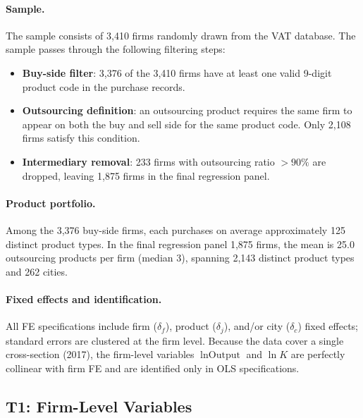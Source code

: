 \documentclass[12pt]{article}
\begin{document}
\paragraph{Sample.}
The sample consists of 3,410 firms randomly drawn from the VAT database.
The sample passes through the following filtering steps:
\begin{itemize}[leftmargin=1.5em,nosep]
  \item \textbf{Buy-side filter}: 3,376 of the 3,410 firms have at least one
    valid 9-digit product code in the purchase records.
  \item \textbf{Outsourcing definition}: an outsourcing product requires the
    same firm to appear on both the buy and sell side for the
    same product code. Only 2,108 firms satisfy this condition. 
  \item \textbf{Intermediary removal}: 233 firms with outsourcing ratio
    \(>90\%\) are dropped, leaving
    1,875 firms in the final regression panel.
\end{itemize}


\paragraph{Product portfolio.}
Among the 3,376 buy-side firms, each purchases on average approximately 125
distinct product types.
In the final regression panel 1,875 firms, the mean is 25.0 outsourcing products per firm
(median 3), spanning 2,143 distinct product types and 262 cities.

\paragraph{Fixed effects and identification.}
All FE specifications include firm (\(\delta_f\)), product (\(\delta_j\)), and/or city (\(\delta_c\)) fixed effects; standard errors are
clustered at the firm level.
Because the data cover a single cross-section (2017), the firm-level variables
\(\ln\text{Output}\) and \(\ln K\) are perfectly collinear with firm FE and are
identified only in OLS specifications. 

\bigskip

\subsection{T1: Firm-Level Variables}
\label{sec:t1}
\end{document}
